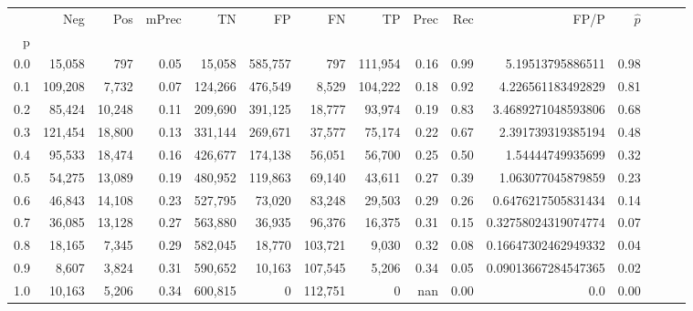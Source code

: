 \begin{tabular}{rrrrrrrrrrrrrrr}
\toprule
{} &      Neg &     Pos & mPrec &       TN &       FP &       FN &       TP &  Prec &   Rec &                 FP/P & $\hat{p}$ \\
p   &          &         &       &          &          &          &          &       &       &                      &           \\
\midrule
0.0 &   15,058 &     797 &  0.05 &   15,058 &  585,757 &      797 &  111,954 &  0.16 &  0.99 &     5.19513795886511 &      0.98 \\
0.1 &  109,208 &   7,732 &  0.07 &  124,266 &  476,549 &    8,529 &  104,222 &  0.18 &  0.92 &    4.226561183492829 &      0.81 \\
0.2 &   85,424 &  10,248 &  0.11 &  209,690 &  391,125 &   18,777 &   93,974 &  0.19 &  0.83 &   3.4689271048593806 &      0.68 \\
0.3 &  121,454 &  18,800 &  0.13 &  331,144 &  269,671 &   37,577 &   75,174 &  0.22 &  0.67 &    2.391739319385194 &      0.48 \\
0.4 &   95,533 &  18,474 &  0.16 &  426,677 &  174,138 &   56,051 &   56,700 &  0.25 &  0.50 &     1.54444749935699 &      0.32 \\
0.5 &   54,275 &  13,089 &  0.19 &  480,952 &  119,863 &   69,140 &   43,611 &  0.27 &  0.39 &    1.063077045879859 &      0.23 \\
0.6 &   46,843 &  14,108 &  0.23 &  527,795 &   73,020 &   83,248 &   29,503 &  0.29 &  0.26 &   0.6476217505831434 &      0.14 \\
0.7 &   36,085 &  13,128 &  0.27 &  563,880 &   36,935 &   96,376 &   16,375 &  0.31 &  0.15 &  0.32758024319074774 &      0.07 \\
0.8 &   18,165 &   7,345 &  0.29 &  582,045 &   18,770 &  103,721 &    9,030 &  0.32 &  0.08 &  0.16647302462949332 &      0.04 \\
0.9 &    8,607 &   3,824 &  0.31 &  590,652 &   10,163 &  107,545 &    5,206 &  0.34 &  0.05 &  0.09013667284547365 &      0.02 \\
1.0 &   10,163 &   5,206 &  0.34 &  600,815 &        0 &  112,751 &        0 &   nan &  0.00 &                  0.0 &      0.00 \\
\bottomrule
\end{tabular}
